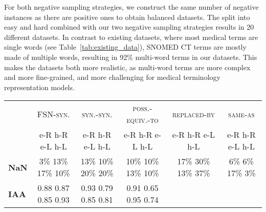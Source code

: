 \documentclass[letterpaper]{article} %
\newcommand{\dataset}[1]{\textsc{#1}}
\begin{document}
For both negative sampling strategies, we construct the same number of negative instances as there are positive ones to obtain balanced datasets.
The split into easy and hard combined with our two negative sampling strategies results in 20 different datasets.
In contrast to existing datasets, where most medical terms are single words (see Table~\ref{tab:existing_data}), SNOMED CT terms are mostly made of multiple words, resulting in 92\% multi-word terms in our datasets.
This makes the datasets both more realistic, as multi-word terms are more complex and more fine-grained, and more challenging for medical terminology representation models.

\begin{table*}[t]
    \centering
    \small
    \begin{tabular}{l ccccc}
    \toprule
        & \dataset{FSN-syn.} & \dataset{syn.-syn.} & \dataset{poss.-equiv.-to} & \dataset{replaced-by} & \dataset{same-as}\\
        \cmidrule(lr){2-2} \cmidrule(lr){3-3} \cmidrule(lr){4-4} \cmidrule(lr){5-5} \cmidrule(lr){6-6}
         & e-R \hspace{0.2cm}  h-R \hspace{0.2cm} e-L \hspace{0.2cm}  h-L &
         e-R \hspace{0.2cm}  h-R \hspace{0.2cm} e-L \hspace{0.2cm}  h-L &
         e-R \hspace{0.2cm}  h-R \hspace{0.2cm} e-L \hspace{0.2cm}  h-L &
         e-R \hspace{0.2cm}  h-R \hspace{0.2cm} e-L \hspace{0.2cm}  h-L&
         e-R \hspace{0.2cm}  h-R \hspace{0.2cm} e-L \hspace{0.2cm}  h-L\\ \midrule
         \textbf{NaN} & 3\% \hfill 13\% \hfill 17\% \hfill 10\% &
          13\% \hfill 10\% \hfill 20\% \hfill  20\% &
          10\% \hfill 10\% \hfill 13\% \hfill 10\% &
          17\% \hfill 30\% \hfill 13\% \hfill 37\% &
          6\% \hfill 6\% \hfill 17\% \hfill  3\% \\
         \textbf{IAA} & 0.88 \hfill 0.87 \hfill 0.85 \hfill 0.93 &
         0.93 \hfill 0.79 \hfill 0.85 \hfill 0.81 &
         0.91 \hfill 0.65 \hfill 0.95 \hfill 0.74 &

\end{tabular}
\end{table*}
\end{document}
